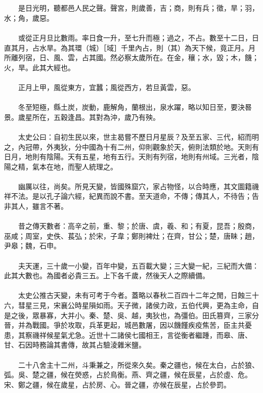 \\\\
　　是日光明，聽都邑人民之聲。聲宮，則歲善，吉；商，則有兵；徵，旱；羽，水；角，歲惡。
\\\\
　　或從正月旦比數雨。率日食一升，至七升而極；過之，不占。數至十二日，日直其月，占水旱。為其環（城）［域］千里內占，則（其）為天下候，竟正月。月所離列宿，日、風、雲，占其國。然必察太歲所在。在金，穰；水，毀；木，饑；火，旱。此其大經也。
\\\\
　　正月上甲，風從東方，宜蠶；風從西方，若旦黃雲，惡。
\\\\
　　冬至短極，縣土炭，炭動，鹿解角，蘭根出，泉水躍，略以知日至，要決晷景。歲星所在，五穀逢昌。其對為沖，歲乃有殃。
\\\\
　　太史公曰：自初生民以來，世主曷嘗不歷日月星辰？及至五家、三代，紹而明之，內冠帶，外夷狄，分中國為十有二州，仰則觀象於天，俯則法類於地。天則有日月，地則有陰陽。天有五星，地有五行。天則有列宿，地則有州域。三光者，陰陽之精，氣本在地，而聖人統理之。
\\\\
　　幽厲以往，尚矣。所見天變，皆國殊窟穴，家占物怪，以合時應，其文圖籍禨祥不法。是以孔子論六經，紀異而說不書。至天道命，不傳；傳其人，不待告；告非其人，雖言不著。
\\\\
　　昔之傳天數者：高辛之前，重、黎；於唐、虞，羲、和；有夏，昆吾；殷商，巫咸；周室，史佚、萇弘；於宋，子韋；鄭則裨灶；在齊，甘公；楚，唐眛；趙，尹皋；魏，石申。
\\\\
　　夫天運，三十歲一小變，百年中變，五百載大變；三大變一紀，三紀而大備：此其大數也。為國者必貴三五。上下各千歲，然後天人之際續備。
\\\\
　　太史公推古天變，未有可考于今者。蓋略以春秋二百四十二年之閒，日蝕三十六，彗星三見，宋襄公時星隕如雨。天子微，諸侯力政，五伯代興，更為主命，自是之後，眾暴寡，大并小。秦、楚、吳、越，夷狄也，為彊伯。田氏篡齊，三家分晉，并為戰國。爭於攻取，兵革更起，城邑數屠，因以饑饉疾疫焦苦，臣主共憂患，其察禨祥候星氣尤急。近世十二諸侯七國相王，言從衡者繼踵，而皋、唐、甘、石因時務論其書傳，故其占驗淩雜米鹽。
\\\\
　　二十八舍主十二州，斗秉兼之，所從來久矣。秦之疆也，候在太白，占於狼、弧。吳、楚之疆，候在熒惑，占於鳥衡。燕、齊之疆，候在辰星，占於虛、危。宋、鄭之疆，候在歲星，占於房、心。晉之疆，亦候在辰星，占於參罰。
